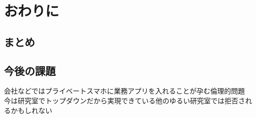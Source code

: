 \chapter{おわりに}
\thispagestyle{myheadings}

\section{まとめ}

\section{今後の課題}




会社などではプライベートスマホに業務アプリを入れることが孕む倫理的問題
今は研究室でトップダウンだから実現できている他のゆるい研究室では拒否されるかもしれない

